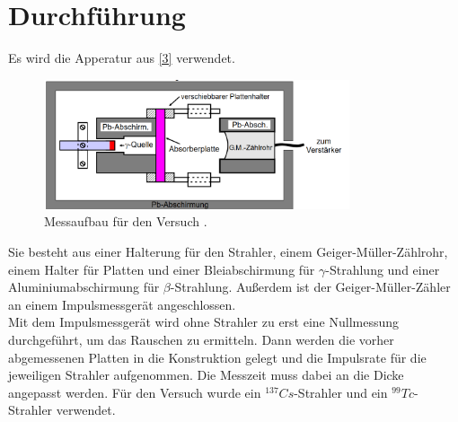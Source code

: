 \section{Durchführung}
\label{sec:Durchführung}
Es wird die Apperatur aus \autoref{3} verwendet. 
\begin{figure}[H]
  \centering
  \includegraphics[width=9cm]{content/3}
  \caption{Messaufbau für den Versuch \cite{sample}.}
  \label{3}
\end{figure}
Sie besteht aus einer Halterung für den Strahler, einem Geiger-Müller-Zählrohr, einem Halter für Platten und einer Bleiabschirmung für $\gamma$-Strahlung und einer Aluminiumabschirmung für $\beta$-Strahlung. Außerdem ist der Geiger-Müller-Zähler an einem Impulsmessgerät angeschlossen.\\
Mit dem Impulsmessgerät wird ohne Strahler zu erst eine Nullmessung durchgeführt, um das Rauschen zu ermitteln. Dann werden die vorher abgemessenen Platten in die Konstruktion gelegt und die Impulsrate für die jeweiligen Strahler aufgenommen. Die Messzeit muss dabei an die Dicke angepasst werden. Für den Versuch wurde ein $^137 Cs$-Strahler und ein $^99 Tc$-Strahler verwendet.
